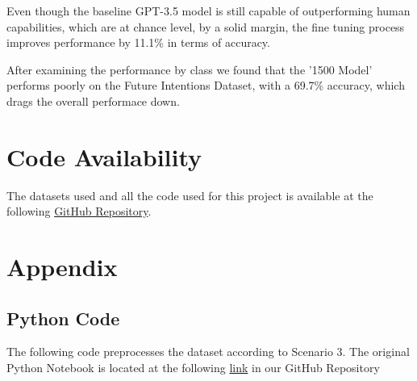 \documentclass[10pt,twocolumn,letterpaper]{article}
\begin{document}
Even though the baseline GPT-3.5 model is still capable of outperforming human capabilities, which
are at chance level, by a solid margin, the fine tuning process improves performance by 11.1\% in terms
of accuracy.

After examining the performance by class we found that the '1500 Model' performs poorly on the Future
Intentions Dataset, with a 69.7\% accuracy, which drags the overall performace down.

\section{Code Availability}
The datasets used and all the code used for this project is available
at the following \href{https://github.com/TannerAGraves/GPT-LieDetection/}{GitHub Repository}.




{\small


}

\clearpage %
\onecolumn %

\section{Appendix}
\label{sec:appendix}

\subsection{Python Code}

The following code preprocesses the dataset according to Scenario 3.
The original Python Notebook is located at the following \href{https://colab.research.google.com/github/TannerAGraves/GPT-LieDetection/blob/main/dataset/datasets.ipynb}{link} in our GitHub Repository
\end{document}
